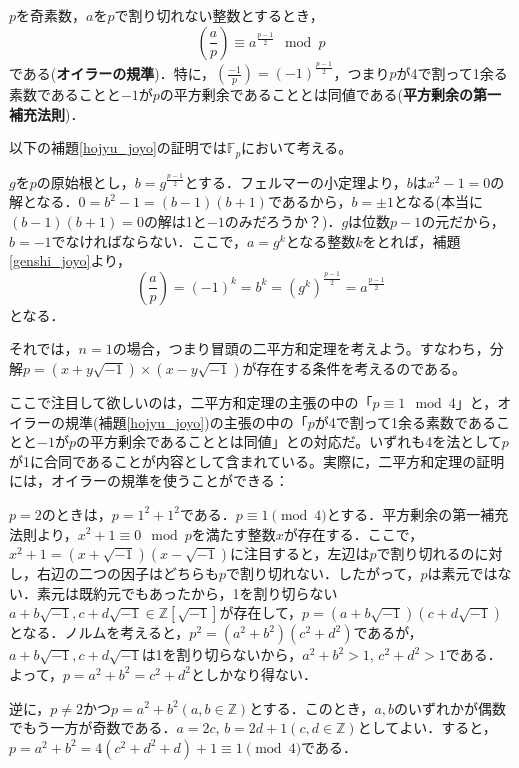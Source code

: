 \begin{lemma}\label{hojyu_joyo}
    $p$を奇素数，$a$を$p$で割り切れない整数とするとき，
    \begin{equation*}
        \left(\frac{a}{p}\right)\equiv a^{\frac{p-1}{2}}\mod{p}
    \end{equation*}
    である(\textbf{オイラーの規準})．特に，$\left(\frac{-1}{p}\right)=(-1)^{\frac{p-1}{2}}$，つまり$p$が4で割って1余る素数であることと$-1$が$p$の平方剰余であることとは同値である(\textbf{平方剰余の第一補充法則})．
\end{lemma}

以下の補題\ref{hojyu_joyo}の証明では$\mathbb{F}_p$において考える。

\begin{prf}
    $g$を$p$の原始根とし，$b=g^{\frac{p-1}{2}}$とする．フェルマーの小定理より，$b$は$x^2-1=0$の解となる．$0=b^2-1=(b-1)(b+1)$であるから，$b=\pm 1$となる(本当に$(b-1)(b+1)=0$の解は1と$-1$のみだろうか？)．$g$は位数$p-1$の元だから，$b=-1$でなければならない．ここで，$a=g^k$となる整数$k$をとれば，補題\ref{genshi_joyo}より，\[
    \left(\frac{a}{p}\right)=(-1)^k=b^k=(g^k)^{\frac{p-1}{2}}=a^{\frac{p-1}{2}}
    \]
    となる．
\end{prf}

それでは，$n=1$の場合，つまり冒頭の二平方和定理を考えよう。すなわち，分解$p=(x+y\sqrt{-1})\times(x-y\sqrt{-1})$が存在する条件を考えるのである。

ここで注目して欲しいのは，二平方和定理の主張の中の「$p\equiv 1\mod{4}$」と，オイラーの規準(補題\ref{hojyu_joyo})の主張の中の「$p$が4で割って1余る素数であることと$-1$が$p$の平方剰余であることとは同値」との対応だ。いずれも4を法として$p$が1に合同であることが内容として含まれている。実際に，二平方和定理の証明には，オイラーの規準を使うことができる：

\begin{prf}
    $p=2$のときは，$p=1^2+1^2$である．$p\equiv 1\pmod{4}$とする．平方剰余の第一補充法則より，$x^2+1\equiv 0\mod{p}$を満たす整数$x$が存在する．ここで，$x^2+1=(x+\sqrt{-1})(x-\sqrt{-1})$に注目すると，左辺は$p$で割り切れるのに対し，右辺の二つの因子はどちらも$p$で割り切れない．したがって，$p$は素元ではない．素元は既約元でもあったから，1を割り切らない$a+b\sqrt{-1}, c+d\sqrt{-1}\in\mathbb{Z}[\sqrt{-1}]$が存在して，$p=(a+b\sqrt{-1})(c+d\sqrt{-1})$となる．ノルムを考えると，$p^2=(a^2+b^2)(c^2+d^2)$であるが，$a+b\sqrt{-1}, c+d\sqrt{-1}$は1を割り切らないから，$a^2+b^2>1,\, c^2+d^2>1$である．よって，$p=a^2+b^2=c^2+d^2$としかなり得ない．

    逆に，$p\ne 2$かつ$p=a^2+b^2\left(a,b\in\mathbb{Z}\right)$とする．このとき，$a, b$のいずれかが偶数でもう一方が奇数である．$a=2c,\, b=2d+1\left(c, d\in\mathbb{Z}\right)$としてよい．すると，$p=a^2+b^2=4(c^2+d^2+d)+1\equiv 1\pmod{4}$である．
\end{prf}

